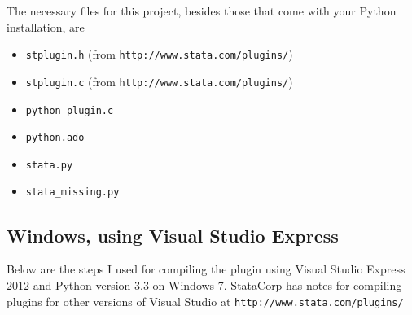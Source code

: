 \documentclass{article}
\begin{document}
The necessary files for this project, besides those that come with your Python installation, are
	\begin{itemize}
		\item \lstinline$stplugin.h$ (from \verb|http://www.stata.com/plugins/|)
		\item \lstinline$stplugin.c$ (from \verb|http://www.stata.com/plugins/|)
		\item \lstinline$python_plugin.c$
		\item \lstinline$python.ado$
		\item \lstinline$stata.py$
		\item \lstinline$stata_missing.py$
	\end{itemize}
		
\subsection{Windows, using Visual Studio Express}
	
Below are the steps I used for compiling the plugin using Visual Studio Express 2012 and Python version 3.3 on Windows 7. StataCorp has notes for compiling plugins for other versions of Visual Studio at \verb|http://www.stata.com/plugins/|
	
\end{document}
